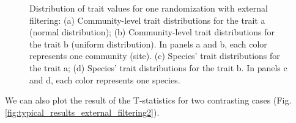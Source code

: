 \documentclass[12pt]{article}\usepackage[]{graphicx}\usepackage[]{color}
\newenvironment{knitrout}{}{} %
\begin{document}
\begin{knitrout}
\begin{figure}
{}

\caption[Distribution of trait values for one randomization with external filtering]{Distribution of trait values for one randomization with external filtering: (a) Community-level trait distributions for the trait a (normal distribution); (b) Community-level trait distributions for the trait b (uniform distribution). In panels a and b, each color represents one community (site). (c) Species' trait distributions for the trait a; (d) Species' trait distributions for the trait b. In panels c and d, each color represents one species.}\label{fig:typical_results_external_filtering1}
\end{figure}


\end{knitrout}

We can also plot the result of the T-statistics for two contrasting cases (Fig. \ref{fig:typical_results_external_filtering2}).
\end{document}
